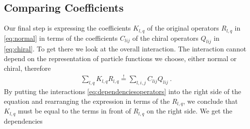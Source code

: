 \subsection{Comparing Coefficients}
Our final step is expressing the coefficients $K_{l,q}$ of the original operators $R_{l,q}$ in \eqref{eq:normal} in terms of the coefficients $C_{lij}$ of the chiral operators $Q_{lij}$ in \eqref{eq:chiral}. To get there we look at the overall interaction. The interaction cannot depend on the representation of particle functions we choose, either normal or chiral, therefore
\begin{align}
	\sum_{l,q} K_{l,q}R_{l,q} \overset{!}{=} \sum_{l,i,j}C_{lij}Q_{lij} \ .
\end{align}
By putting the interactions \eqref{eq:dependenciesoperators} into the right side of the equation and rearranging the expression in terms of the $R_{l,q}$, we conclude that $K_{l,q}$ must be equal to the terms in front of $R_{l,q}$ on the right side. We get the dependencies
